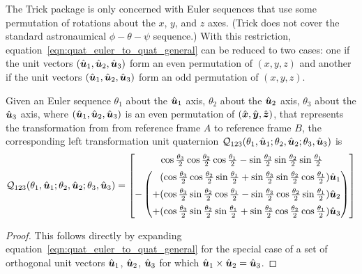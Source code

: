 The Trick package is only concerned with Euler sequences that use some
permutation of rotations about the $x$, $y$, and $z$ axes.
(Trick does not cover the standard astronaumical $\phi-\theta-\psi$ sequence.)
With this restriction, equation~\eqref{eqn:quat_euler_to_quat_general} can be
reduced to two cases:
one if the unit vectors $(\hat{\boldsymbol{u}}_1, \hat{\boldsymbol{u}}_2, \hat{\boldsymbol{u}}_3)$
form an even permutation of $(x, y, z)$
and another if the unit vectors $(\hat{\boldsymbol{u}}_1, \hat{\boldsymbol{u}}_2, \hat{\boldsymbol{u}}_3)$
form an odd permutation of $(x, y, z)$.

\begin{theorem}\label{thm:quat_rot_to_quat_even}
Given an Euler sequence
$\theta_1$ about the $\hat{\boldsymbol{u}}_1$ axis,
$\theta_2$ about the $\hat{\boldsymbol{u}}_2$ axis,
$\theta_3$ about the $\hat{\boldsymbol{u}}_3$ axis,
where $(\hat{\boldsymbol{u}}_1, \hat{\boldsymbol{u}}_2, \hat{\boldsymbol{u}}_3)$ is an
even permutation of $(\hat{\boldsymbol{x}}, \hat{\boldsymbol{y}}, \hat{\boldsymbol{z}})$,
that represents the transformation from
from reference frame $A$ to reference frame $B$,
the corresponding left transformation unit quaternion
$\mathcal{Q}_{123}
  (\theta_{1}, \hat{\boldsymbol{u}}_1; \theta_{2}, \hat{\boldsymbol{u}}_2; \theta_{3}, \hat{\boldsymbol{u}}_3)$
is
\begin{equation}
  \quat{Q}_{123}
    (\theta_{1}, \vhat u_1; \theta_{2}, \vhat u_2; \theta_{3}, \vhat u_3) =
       \quatsv[5pt]
        {\cos\frac{\theta_3}2 \cos\frac{\theta_2}2 \cos\frac{\theta_1}2
          - \sin\frac{\theta_3}2 \sin\frac{\theta_2}2 \sin\frac{\theta_1}2}
        {
          - \begin{pmatrix}
          \phantom{+}
            (\cos\frac{\theta_3}2 \cos\frac{\theta_2}2 \sin\frac{\theta_1}2
            + \sin\frac{\theta_3}2 \sin\frac{\theta_2}2 \cos\frac{\theta_1}2)
            \vhat u_1 \\[5pt]
          +
            (\cos\frac{\theta_3}2 \sin\frac{\theta_2}2 \cos\frac{\theta_1}2
            - \sin\frac{\theta_3}2 \cos\frac{\theta_2}2 \sin\frac{\theta_1}2)
            \vhat u_2 \\[5pt]
          +
           (\cos\frac{\theta_3}2 \sin\frac{\theta_2}2 \sin\frac{\theta_1}2
            + \sin\frac{\theta_3}2 \cos\frac{\theta_2}2 \cos\frac{\theta_1}2)
           \vhat u_3
           \end{pmatrix}}
   \label{eqn:quat_rot_to_quat_even}
\end{equation}
\end{theorem}
\begin{proof}
This follows directly by expanding
equation~\eqref{eqn:quat_euler_to_quat_general}
for the special case of a set of orthogonal unit vectors
$\hat{\boldsymbol{u}}_1$, $\hat{\boldsymbol{u}}_2$, $\hat{\boldsymbol{u}}_3$
for which $\hat{\boldsymbol{u}}_1 \times \hat{\boldsymbol{u}}_2 = \hat{\boldsymbol{u}}_3$.
\end{proof}

